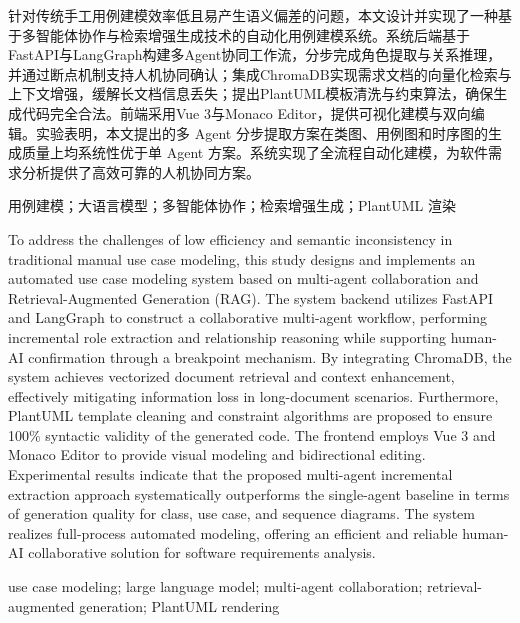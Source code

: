 \begin{abstractCN}
    针对传统手工用例建模效率低且易产生语义偏差的问题，本文设计并实现了一种基于多智能体协作与检索增强生成技术的自动化用例建模系统。系统后端基于FastAPI与LangGraph构建多Agent协同工作流，分步完成角色提取与关系推理，并通过断点机制支持人机协同确认；集成ChromaDB实现需求文档的向量化检索与上下文增强，缓解长文档信息丢失；提出PlantUML模板清洗与约束算法，确保生成代码完全合法。前端采用Vue 3与Monaco Editor，提供可视化建模与双向编辑。实验表明，本文提出的多 Agent 分步提取方案在类图、用例图和时序图的生成质量上均系统性优于单 Agent 方案。系统实现了全流程自动化建模，为软件需求分析提供了高效可靠的人机协同方案。

    \keywordsCN 用例建模；大语言模型；多智能体协作；检索增强生成；PlantUML 渲染
\end{abstractCN}

\begin{abstractENG}
    To address the challenges of low efficiency and semantic inconsistency in traditional manual use case modeling, this study designs and implements an automated use case modeling system based on multi-agent collaboration and Retrieval-Augmented Generation (RAG). The system backend utilizes FastAPI and LangGraph to construct a collaborative multi-agent workflow, performing incremental role extraction and relationship reasoning while supporting human-AI confirmation through a breakpoint mechanism. By integrating ChromaDB, the system achieves vectorized document retrieval and context enhancement, effectively mitigating information loss in long-document scenarios. Furthermore, PlantUML template cleaning and constraint algorithms are proposed to ensure 100\% syntactic validity of the generated code. The frontend employs Vue 3 and Monaco Editor to provide visual modeling and bidirectional editing. Experimental results indicate that the proposed multi-agent incremental extraction approach systematically outperforms the single-agent baseline in terms of generation quality for class, use case, and sequence diagrams. The system realizes full-process automated modeling, offering an efficient and reliable human-AI collaborative solution for software requirements analysis.

    \keywordsENG use case modeling; large language model; multi-agent collaboration; retrieval-augmented generation; PlantUML rendering
\end{abstractENG}

